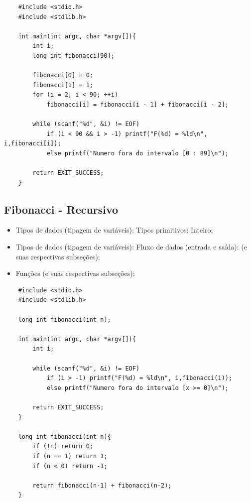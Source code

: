 \documentclass[12pt]{article}
\begin{document}
\hspace{0.25cm}
\begin{lstlisting}
    #include <stdio.h>
    #include <stdlib.h>
        
    int main(int argc, char *argv[]){
    	int i;
        long int fibonacci[90];
           
        fibonacci[0] = 0;
    	fibonacci[1] = 1;
        for (i = 2; i < 90; ++i)
            fibonacci[i] = fibonacci[i - 1] + fibonacci[i - 2];
            
        while (scanf("%d", &i) != EOF)
            if (i < 90 && i > -1) printf("F(%d) = %ld\n", i,fibonacci[i]);
            else printf("Numero fora do intervalo [0 : 89]\n");
            
        return EXIT_SUCCESS;
    }
\end{lstlisting}

\newpage
\subsection{Fibonacci - Recursivo}

\hspace{0.25cm}
\begin{tcolorbox}[colback=violet!5!white,colframe=violet!75!white,title=Capítulos recomendados:]
    \begin{itemize}
        \item Tipos de dados (tipagem de variáveis): Tipos primitivos: Inteiro;
        \item Tipos de dados (tipagem de variáveis): Fluxo de dados (entrada e saída): (e suas respectivas subseções);
        \item Funções (e suas respectivas subseções);
    \end{itemize}
\end{tcolorbox}

\hspace{0.25cm}
\begin{lstlisting}
    #include <stdio.h>
    #include <stdlib.h>
    
    long int fibonacci(int n);
    
    int main(int argc, char *argv[]){
    	int i;
    
        while (scanf("%d", &i) != EOF)
            if (i > -1) printf("F(%d) = %ld\n", i,fibonacci(i));
            else printf("Numero fora do intervalo [x >= 0]\n");
            
        return EXIT_SUCCESS;
    }
    
    long int fibonacci(int n){
    	if (!n) return 0;
    	if (n == 1) return 1;
    	if (n < 0) return -1;
    	
    	return fibonacci(n-1) + fibonacci(n-2);
    }
\end{lstlisting}
\end{document}
